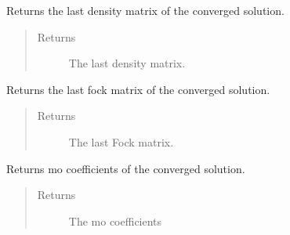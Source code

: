 \documentclass[letterpaper,10pt,english]{sphinxmanual}
\begin{document}
\begin{fulllineitems}
\begin{fulllineitems}
\end{fulllineitems}


\begin{fulllineitems}
\label{\detokenize{RHF:ghf.RHF.RHF.get_last_dens}}
Returns the last density matrix of the converged solution.
\begin{quote}\begin{description}
\item[{Returns}] \leavevmode
The last density matrix.

\end{description}\end{quote}

\end{fulllineitems}


\begin{fulllineitems}
\label{\detokenize{RHF:ghf.RHF.RHF.get_last_fock}}
Returns the last fock matrix of the converged solution.
\begin{quote}\begin{description}
\item[{Returns}] \leavevmode
The last Fock matrix.

\end{description}\end{quote}

\end{fulllineitems}


\begin{fulllineitems}
\label{\detokenize{RHF:ghf.RHF.RHF.get_mo_coeff}}
Returns mo coefficients of the converged solution.
\begin{quote}\begin{description}
\item[{Returns}] \leavevmode
The mo coefficients

\end{description}\end{quote}


\end{fulllineitems}
\end{fulllineitems}
\end{document}
